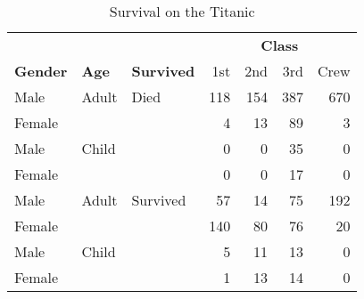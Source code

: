 \begin{table}[htb]
 \caption{Survival on the Titanic}
 \label{tab:titanic}
 \begin{center}
  \begin{tabular}{|lll|rrrr|}
   \hline
 &  &  & \multicolumn{4}{c|}{\bfseries\large Class   }\rule{0in}{2.5ex}\\
{\bfseries\large Gender     } & {\bfseries\large Age     } & {\bfseries\large Survived} & 1st      & 2nd      & 3rd      & Crew     \\
   \hline
Male     & Adult   & Died       &    118 &    154 &    387 &    670 \\
Female   &         &            &      4 &     13 &     89 &      3 \\
[4pt]
Male     & Child   &            &      0 &      0 &     35 &      0 \\
Female   &         &            &      0 &      0 &     17 &      0 \\
[4pt]
Male     & Adult   & Survived   &     57 &     14 &     75 &    192 \\
Female   &         &            &    140 &     80 &     76 &     20 \\
[4pt]
Male     & Child   &            &      5 &     11 &     13 &      0 \\
Female   &         &            &      1 &     13 &     14 &      0 \\
   \hline
  \end{tabular}
 \end{center}
\end{table}
